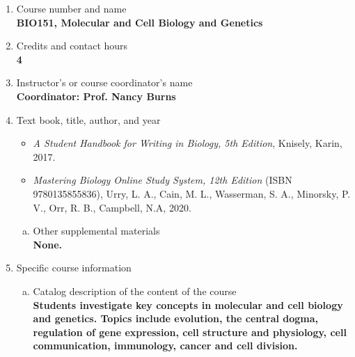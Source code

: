 \label{BIO151}  %
\begin{enumerate}[1.]
\item Course number and name\\
  {\bfseries
    BIO151, Molecular and Cell Biology and Genetics
  }
  
\item Credits and contact hours\\
  {\bfseries
    4    
  }

\item Instructor's or course coordinator's name\\
  {\bfseries
    Coordinator: Prof. Nancy Burns
  }

\item Text book, title, author, and year\\
  {\bfseries
    \begin{itemize}
    \item {\em A Student Handbook for Writing in Biology, 5th Edition}, Knisely, Karin, 2017.
    \item {\em Mastering Biology Online Study System, 12th Edition} (ISBN 9780135855836),
          Urry, L. A.,
          Cain, M. L.,
          Wasserman, S. A.,
          Minorsky, P. V.,
          Orr, R. B.,
          Campbell, N.A, 2020.
    \end{itemize}
  }
\begin{enumerate}[a.]
\item Other supplemental materials\\
  {\bfseries
    None.    
  }
\end{enumerate}

\item Specific course information
\begin{enumerate}[a.]  
\item Catalog description of the content of the course\\
  {\bfseries
Students investigate key concepts in molecular and cell biology and genetics. Topics include evolution, the central dogma, regulation of gene expression, cell structure and physiology, cell communication, immunology, cancer and cell division.     
  }


\end{enumerate}
\end{enumerate}
